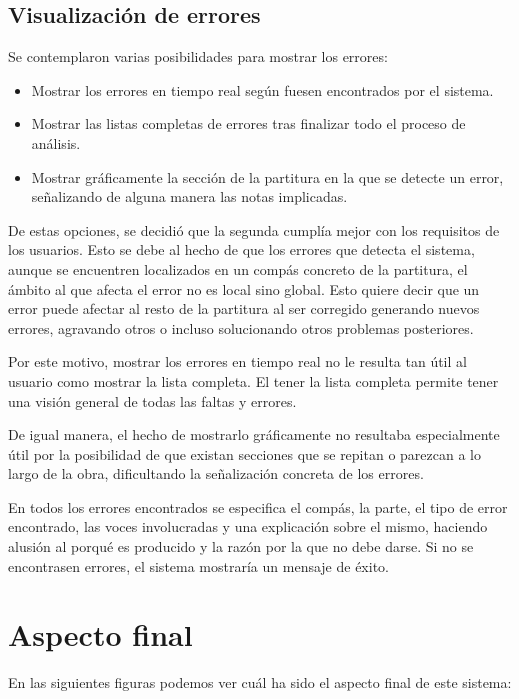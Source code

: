 \subsection{Visualización de errores}

Se contemplaron varias posibilidades para mostrar los errores:

\begin{itemize}
	\item Mostrar los errores en tiempo real según fuesen encontrados por el sistema.
	\item Mostrar las listas completas de errores tras finalizar todo el proceso de análisis.
	\item Mostrar gráficamente la sección de la partitura en la que se detecte un error, señalizando de alguna manera las notas implicadas.
\end{itemize}

De estas opciones, se decidió que la segunda cumplía mejor con los requisitos de los usuarios. Esto se debe al hecho de que los errores que detecta el sistema, aunque se encuentren localizados en un compás concreto de la partitura, el ámbito al que afecta el error no es local sino global. Esto quiere decir que un error puede afectar al resto de la partitura al ser corregido generando nuevos errores, agravando otros o incluso solucionando otros problemas posteriores. 

Por este motivo, mostrar los errores en tiempo real no le resulta tan útil al usuario como mostrar la lista completa. El tener la lista completa permite tener una visión general de todas las faltas y errores. 

De igual manera, el hecho de mostrarlo gráficamente no resultaba especialmente útil por la posibilidad de que existan secciones que se repitan o parezcan a lo largo de la obra, dificultando la señalización concreta de los errores. 

En todos los errores encontrados se especifica el compás, la parte, el tipo de error encontrado, las voces involucradas y una explicación sobre el mismo, haciendo alusión al porqué es producido y la razón por la que no debe darse. Si no se encontrasen errores, el sistema mostraría un mensaje de éxito.

\section{Aspecto final}

En las siguientes figuras podemos ver cuál ha sido el aspecto final de este sistema:

